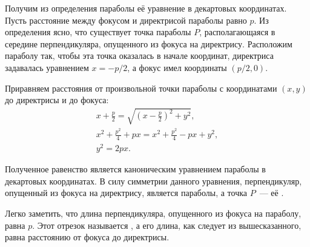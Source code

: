 Получим из определения параболы её уравнение в декартовых координатах. Пусть расстояние между фокусом и директрисой параболы равно $p$. Из определения ясно, что существует точка параболы $P$, располагающаяся в середине перпендикуляра, опущенного из фокуса на директрису. Расположим параболу так, чтобы эта точка оказалась в начале координат, директриса задавалась уравнением $x = -p/2$, а фокус имел координаты $(p/2, 0)$.

Приравняем расстояния от произвольной точки параболы с координатами $(x, y)$ до директрисы и до фокуса:
\begin{gather*}
    x + \frac{p}{2} = \sqrt{\left(x - \frac{p}{2} \right)^2 + y^2},\\
    x^2 + \frac{p^2}{4} + px = x^2 + \frac{p^2}{4} - px + y^2,\\
    y^2 = 2px. \tag{\theequation}
\end{gather*}

Полученное равенство является каноническим уравнением параболы в декартовых координатах. В силу симметрии данного уравнения, перпендикуляр, опущенный из фокуса на директрису, является  параболы, а точка $P$~--- её .

Легко заметить, что длина перпендикуляра, опущенного из фокуса на параболу, равна $p$. Этот отрезок называется , а его длина, как следует из вышесказанного, равна расстоянию от фокуса до директрисы.

